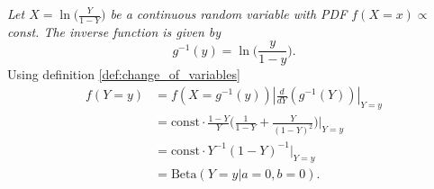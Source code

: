 \begin{example}
	\emph{Let $X = \ln\big(\frac{Y}{1-Y}\big)$ be a continuous random variable with PDF $f(X=x)\propto $const. The inverse function is given by}
	\begin{equation}
		g^{-1}(y) = \ln\bigg(\frac{y}{1-y}\bigg).
	\end{equation}
	Using definition \ref{def:change_of_variables}
	\begin{equation}
		\begin{split}
			f(Y=y) &= f\left( X = g^{-1}(y) \right) \left| \frac{d}{d Y} \left( g^{-1}(Y) \right) \right|_{Y=y}\\
			& = \text{const}\cdot \frac{1-Y}{Y}\bigg(\frac{1}{1-Y}+\frac{Y}{(1-Y)^2}\bigg)\bigg|_{Y=y}\\
			&=\text{const}\cdot Y^{-1}(1-Y)^{-1}|_{Y=y}\\
			&=\text{Beta}(Y=y|a=0,b=0).
		\end{split}
	\end{equation}
\end{example}

